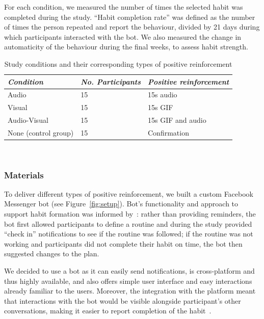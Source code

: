 \documentclass{scaffold/sigchi}
\begin{document}
For each condition, we measured the number of times the selected habit was completed during the study. ``Habit completion rate'' was defined as the number of times the person repeated and report the behaviour, divided by 21 days during which participants interacted with the bot. We also measured the change in automaticity of the behaviour during the final weeks, to assess habit strength.

\begin{table}[b]
  \centering
  \begin{tabular}{l l l}
    {\small\textit{Condition}} & {\small \textit{No. Participants}} & {\small \textit{Positive reinforcement}} \\
    \midrule
    Audio & 15 & 15s audio\\
    Visual & 15 & 15s GIF \\
    Audio-Visual & 15 & 15s GIF and audio \\
    None (control group) & 15 & Confirmation \\
  \end{tabular}
  \caption{Study conditions and their corresponding types of positive reinforcement}~\label{fig:precise_rewards}
\end{table}

\subsubsection{Materials}
To deliver different types of positive reinforcement, we built a custom Facebook Messenger bot (see Figure~\ref{fig:setup}). Bot's functionality and approach to support habit formation was informed by~\cite{article_beyond_self_tracking_designing_apps}: rather than providing reminders, the bot first allowed participants to define a routine and during the study provided ``check in'' notifications to see if the routine was followed; if the routine was not working and participants did not complete their habit on time, the bot then suggested changes to the plan.

We decided to use a bot as it can easily send notifications, is cross-platform and thus highly available, and also offers simple user interface and easy interactions already familiar to the users. Moreover, the integration with the platform meant that interactions with the bot would be visible alongside participant's other conversations, making it easier to report completion of the habit~\cite{the_power_of_logging_mobile_notifications}.
\end{document}
